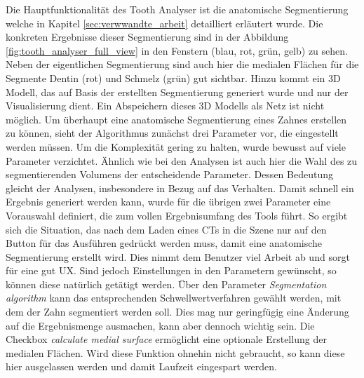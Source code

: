 Die Hauptfunktionalität des Tooth Analyser ist die anatomische Segmentierung
welche in Kapitel \ref{sec:verwwandte_arbeit} detailliert erläutert wurde. Die konkreten
Ergebnisse dieser Segmentierung sind in der Abbildung \ref{fig:tooth_analyser_full_view}
in den Fenstern (blau, rot, grün, gelb) zu sehen. Neben der eigentlichen Segmentierung
sind auch hier die medialen Flächen für die Segmente Dentin (rot) und Schmelz (grün)
gut sichtbar. Hinzu kommt ein \ac{3D} Modell, das auf Basis der erstellten
Segmentierung generiert wurde und nur der Visualisierung dient. Ein Abspeichern dieses
3D Modells als Netz ist nicht möglich. Um überhaupt eine anatomische
Segmentierung eines Zahnes erstellen zu können, sieht der Algorithmus zunächst drei
Parameter vor, die eingestellt werden müssen. Um die Komplexität gering zu halten,
wurde bewusst auf viele Parameter verzichtet. Ähnlich wie bei den Analysen ist auch
hier die Wahl des zu segmentierenden Volumens der entscheidende Parameter.
Dessen Bedeutung gleicht der Analysen, insbesondere in Bezug auf das Verhalten.
Damit schnell ein Ergebnis generiert werden kann, wurde für die übrigen zwei Parameter
eine Vorauswahl definiert, die zum vollen Ergebnisumfang des Tools führt. So ergibt
sich die Situation, das nach dem Laden eines \ac{CT}s in die Szene nur auf den
Button für das Ausführen gedrückt werden muss, damit eine anatomische Segmentierung
erstellt wird. Dies nimmt dem Benutzer viel Arbeit ab und sorgt für eine gut \ac{UX}.
Sind jedoch Einstellungen in den Parametern gewünscht, so können diese natürlich
getätigt werden. Über den Parameter \textit{Segmentation algorithm} kann das entsprechenden
Schwellwertverfahren gewählt werden, mit dem der Zahn segmentiert werden soll. Dies
mag nur geringfügig eine Änderung auf die Ergebnismenge ausmachen, kann aber
dennoch wichtig sein. Die Checkbox \textit{calculate medial surface} ermöglicht
eine optionale Erstellung der medialen Flächen. Wird diese Funktion ohnehin nicht
gebraucht, so kann diese hier ausgelassen werden und damit Laufzeit eingespart
werden.


